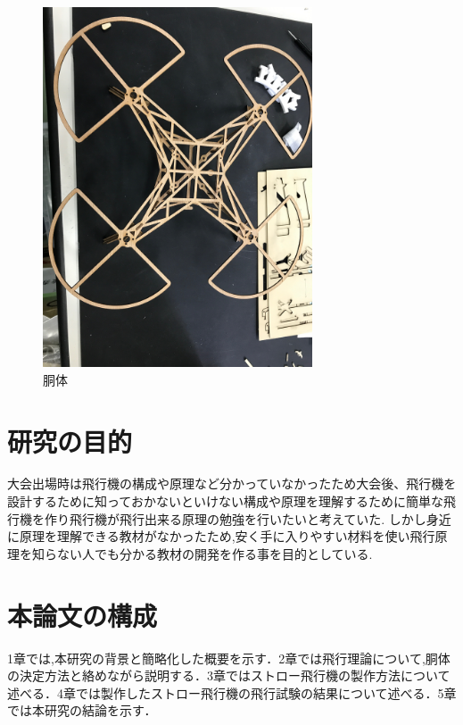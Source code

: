 \begin{figure}[htbp]
  \begin{center}
    \includegraphics[width=80mm]{doutai.jpg}
    \end{center}
  \caption{胴体}
 \label{fig:doutai}
\end{figure}

\section{研究の目的}
大会出場時は飛行機の構成や原理など分かっていなかったため大会後、飛行機を設計するために知っておかないといけない構成や原理を理解するために簡単な飛行機を作り飛行機が飛行出来る原理の勉強を行いたいと考えていた.
しかし身近に原理を理解できる教材がなかったため,安く手に入りやすい材料を使い飛行原理を知らない人でも分かる教材の開発を作る事を目的としている.



\section{本論文の構成}
1章では,本研究の背景と簡略化した概要を示す．2章では飛行理論について,胴体の決定方法と絡めながら説明する．3章ではストロー飛行機の製作方法について述べる．4章では製作したストロー飛行機の飛行試験の結果について述べる．5章では本研究の結論を示す．